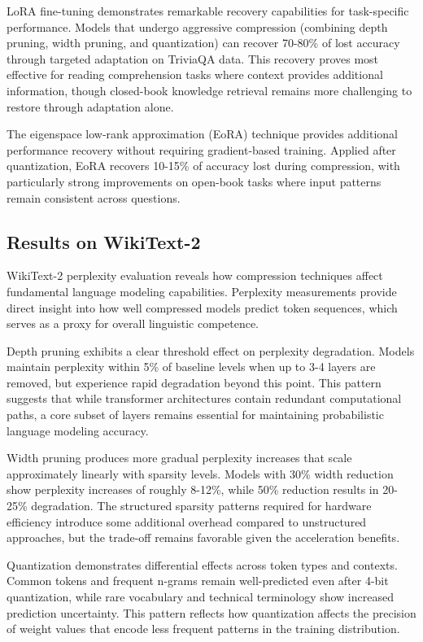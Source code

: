 LoRA fine-tuning demonstrates remarkable recovery capabilities for task-specific performance. Models that undergo aggressive compression (combining depth pruning, width pruning, and quantization) can recover 70-80\% of lost accuracy through targeted adaptation on TriviaQA data. This recovery proves most effective for reading comprehension tasks where context provides additional information, though closed-book knowledge retrieval remains more challenging to restore through adaptation alone.

The eigenspace low-rank approximation (EoRA) technique provides additional performance recovery without requiring gradient-based training. Applied after quantization, EoRA recovers 10-15\% of accuracy lost during compression, with particularly strong improvements on open-book tasks where input patterns remain consistent across questions.

\subsection{Results on WikiText-2}

WikiText-2 perplexity evaluation reveals how compression techniques affect fundamental language modeling capabilities. Perplexity measurements provide direct insight into how well compressed models predict token sequences, which serves as a proxy for overall linguistic competence.

Depth pruning exhibits a clear threshold effect on perplexity degradation. Models maintain perplexity within 5\% of baseline levels when up to 3-4 layers are removed, but experience rapid degradation beyond this point. This pattern suggests that while transformer architectures contain redundant computational paths, a core subset of layers remains essential for maintaining probabilistic language modeling accuracy.

Width pruning produces more gradual perplexity increases that scale approximately linearly with sparsity levels. Models with 30\% width reduction show perplexity increases of roughly 8-12\%, while 50\% reduction results in 20-25\% degradation. The structured sparsity patterns required for hardware efficiency introduce some additional overhead compared to unstructured approaches, but the trade-off remains favorable given the acceleration benefits.

Quantization demonstrates differential effects across token types and contexts. Common tokens and frequent n-grams remain well-predicted even after 4-bit quantization, while rare vocabulary and technical terminology show increased prediction uncertainty. This pattern reflects how quantization affects the precision of weight values that encode less frequent patterns in the training distribution.

